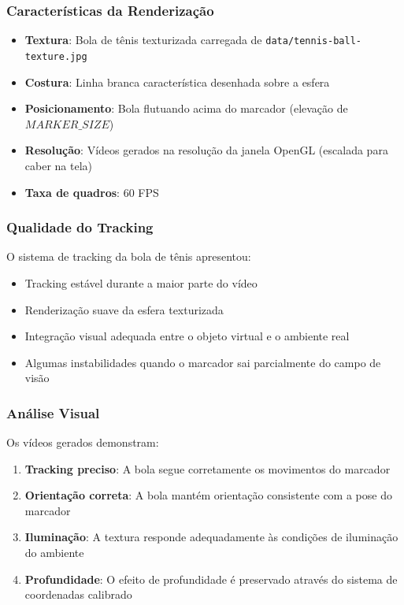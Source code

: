 \subsubsection{Características da Renderização}

\begin{itemize}
    \item \textbf{Textura}: Bola de tênis texturizada carregada de \texttt{data/tennis-ball-texture.jpg}
    \item \textbf{Costura}: Linha branca característica desenhada sobre a esfera
    \item \textbf{Posicionamento}: Bola flutuando acima do marcador (elevação de $MARKER\_SIZE$)
    \item \textbf{Resolução}: Vídeos gerados na resolução da janela OpenGL (escalada para caber na tela)
    \item \textbf{Taxa de quadros}: 60 FPS
\end{itemize}

\subsubsection{Qualidade do Tracking}

O sistema de tracking da bola de tênis apresentou:
\begin{itemize}
    \item Tracking estável durante a maior parte do vídeo
    \item Renderização suave da esfera texturizada
    \item Integração visual adequada entre o objeto virtual e o ambiente real
    \item Algumas instabilidades quando o marcador sai parcialmente do campo de visão
\end{itemize}

\subsubsection{Análise Visual}

Os vídeos gerados demonstram:
\begin{enumerate}
    \item \textbf{Tracking preciso}: A bola segue corretamente os movimentos do marcador
    \item \textbf{Orientação correta}: A bola mantém orientação consistente com a pose do marcador
    \item \textbf{Iluminação}: A textura responde adequadamente às condições de iluminação do ambiente
    \item \textbf{Profundidade}: O efeito de profundidade é preservado através do sistema de coordenadas calibrado
\end{enumerate}

